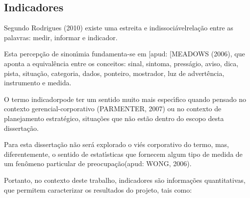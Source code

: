 \documentclass[
12pt,		%
openright,	%
twoside,  %
a4paper,			%
chapter=TITLE,		%
english,			%
french,				%
spanish,			%
brazil				%
]{USPSC-classe/USPSC}
\begin{document}
\subsection[Indicadores]{Indicadores}\label{Indicadores}
Segundo  Rodrigues (2010)  existe uma \textquotedbl estreita e indissoci\'avel\textquotedbl  rela\c{c}\~ao entre as palavras: medir, informar e \textquotedbl indicador\textquotedbl .










Esta percep\c{c}\~ao de sinon\'{\i}mia fundamenta-se em [apud: [MEADOWS (2006), que aponta a equival\^encia entre os conceitos: sinal, sintoma, press\'agio, aviso, dica, pista, situa\c{c}\~ao, categoria, dados, ponteiro, mostrador, luz de advert\^encia, instrumento e medida.










O termo \textquotedbl indicador\textquotedbl  pode ter um sentido muito mais espec\'{\i}fico quando pensado no contexto gerencial-corporativo (PARMENTER, 2007) ou no contexto de planejamento estrat\'egico, situa\c{c}\~oes que n\~ao est\~ao dentro do escopo desta disserta\c{c}\~ao.










Para esta disserta\c{c}\~ao n\~ao ser\'a explorado o vi\'es corporativo do termo, mas, diferentemente, o sentido de \textquotedbl estat\'{\i}sticas que fornecem algum tipo de medida de um fen\^omeno particular de preocupa\c{c}\~ao\textquotedbl  (apud: WONG, 2006).










Portanto, no contexto deste trabalho, indicadores s\~ao informa\c{c}\~oes quantitativas, que permitem caracterizar os resultados do projeto, tais como:
\end{document}
